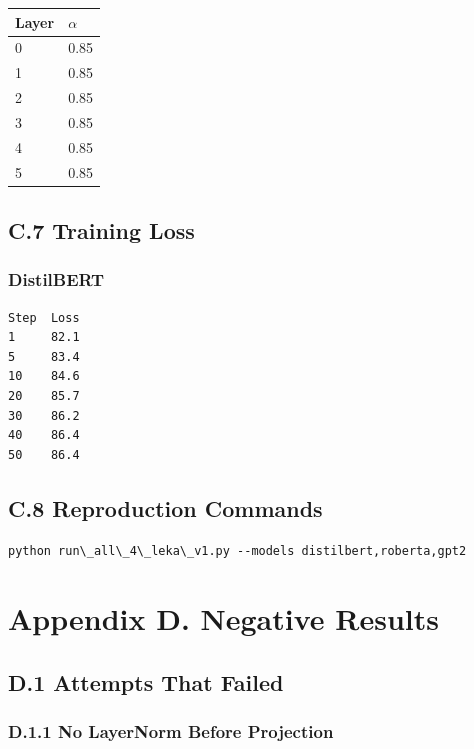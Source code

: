 \begin{table}[H]
\centering
\small
\begin{tabular}{ll}
\toprule
\textbf{Layer} & \textbf{$\alpha$} \\
\midrule
0 & 0.85 \\
1 & 0.85 \\
2 & 0.85 \\
3 & 0.85 \\
4 & 0.85 \\
5 & 0.85 \\
\bottomrule
\end{tabular}
\end{table}

\subsection{C.7 Training Loss}

\subsubsection{DistilBERT}
\begin{lstlisting}
Step  Loss
1     82.1
5     83.4
10    84.6
20    85.7
30    86.2
40    86.4
50    86.4
\end{lstlisting}

\subsection{C.8 Reproduction Commands}

\begin{lstlisting}
python run\_all\_4\_leka\_v1.py --models distilbert,roberta,gpt2
\end{lstlisting}



\section{Appendix D. Negative Results}

\subsection{D.1 Attempts That Failed}

\subsubsection{D.1.1 No LayerNorm Before Projection}

